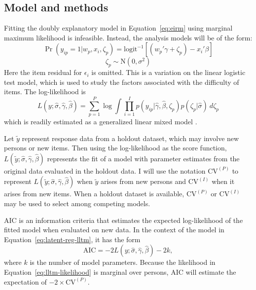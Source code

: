 \documentclass[letterpaper]{article}
\begin{document}
\subsection{Model and methods}

Fitting the doubly explanatory model in Equation~\ref{eq:eirm} using marginal maximum likelihood is infeasible. Instead, the analysis models will be of the form:
\begin{equation} \label{eq:latent-reg-lltm}
	\Pr(y_{ip} = 1 | w_p, x_i, \zeta_p) =
	\mathrm{logit}^{-1} \left [ (w_p'\gamma + \zeta_p) - x_i'\beta \right ]
\end{equation}
\begin{equation}
	\zeta_p \sim \mathrm{N}(0, \sigma^2)
\end{equation}
Here the item residual for $\epsilon_i$ is omitted. This is a variation on the linear logistic test model, which is used to study the factors associated with the difficulty of items. The log-likelihood is
\begin{equation} \label{eq:lltm-likelihood}
	L(y ; \hat \sigma, \hat \gamma, \hat \beta) = 
	\sum_{p=1}^P \log
	\int \prod_{i=1}^I
		p(y_{ip} | \hat \gamma, \hat \beta, \zeta_p)
		p(\zeta_p | \hat \sigma)
	~d \zeta_p
\end{equation}
which is readily estimated as a generalized linear mixed model \cite{Rijmen2003}.

Let $\tilde y$ represent response data from a holdout dataset, which may involve new persons or new items.
Then using the log-likelihood as the score function, $L(\tilde y ; \hat \sigma, \hat \gamma, \hat \beta)$ represents the fit of a model with parameter estimates from the original data evaluated in the holdout data. I will use the notation $\mathrm{CV}^{(P)}$ to represent $L(\tilde y ; \hat \sigma, \hat \gamma, \hat \beta)$ when $\tilde y$ arises from new persons and $\mathrm{CV}^{(I)}$ when it arises from new items. When a holdout dataset is available, $\mathrm{CV}^{(P)}$ or $\mathrm{CV}^{(I)}$ may be used to select among competing models.

AIC \cite{akaike1974new} is an information criteria that estimates the expected log-likelihood of the fitted model when evaluated on new data. In the context of the model in Equation~\ref{eq:latent-reg-lltm}, it has the form
\begin{equation} 
	\mathrm{AIC} = -2 L(y ; \hat \sigma, \hat \gamma, \hat \beta) - 2k
,\end{equation}
where $k$ is the number of model parameters. Because the likelihood in Equation~\ref{eq:lltm-likelihood} is marginal over persons, AIC will estimate the expectation of $-2 \times \mathrm{CV}^{(P)}$.
\end{document}
